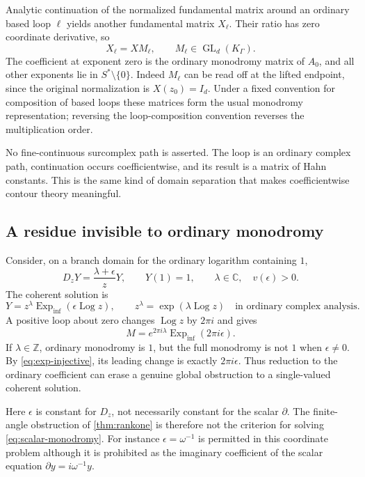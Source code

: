 \documentclass[11pt,letterpaper]{article}
\numberwithin{equation}{section}
\theoremstyle{definition}
\theoremstyle{remark}
\newcommand{\C}{\mathbb C}
\newcommand{\Z}{\mathbb Z}
\newcommand{\D}{\partial}
\newcommand{\Einf}{\operatorname{Exp}_{\mathrm{inf}}}
\newcommand{\Log}{\operatorname{Log}}
\newcommand{\GL}{\operatorname{GL}}
\begin{document}
Analytic continuation of the normalized fundamental matrix around an
ordinary based loop $\ell$ yields another fundamental matrix $X_\ell$.
Their ratio has zero coordinate derivative, so
\begin{equation}\label{eq:monodromy}
 X_\ell=X M_\ell,\qquad M_\ell\in\GL_d(K_\Gamma).
\end{equation}
The coefficient at exponent zero is the ordinary monodromy matrix of
$A_0$, and all other exponents lie in $S^*\setminus\{0\}$.
Indeed $M_\ell$ can be read off at the lifted endpoint, since the original
normalization is $X(z_0)=I_d$. Under a fixed convention for composition of
based loops these matrices form the usual monodromy representation; reversing
the loop-composition convention reverses the multiplication order.

No fine-continuous surcomplex path is asserted. The loop is an ordinary
complex path, continuation occurs coefficientwise, and its result is a
matrix of Hahn constants. This is the same kind of domain separation that
makes coefficientwise contour theory meaningful.

\subsection{A residue invisible to ordinary monodromy}
Consider, on a branch domain for the ordinary logarithm containing $1$,
\begin{equation}\label{eq:scalar-monodromy}
 D_zY=\frac{\lambda+\epsilon}{z}Y,\qquad Y(1)=1,
 \qquad \lambda\in\C,\quad v(\epsilon)>0.
\end{equation}
The coherent solution is
\[
 Y=z^\lambda\Einf(\epsilon\Log z),
 \qquad z^\lambda=\exp(\lambda\Log z)
 \quad\text{in ordinary complex analysis}.
\]
A positive loop about zero changes $\Log z$ by $2\pi i$ and gives
\begin{equation}\label{eq:infmonodromy}
 M=e^{2\pi i\lambda}\Einf(2\pi i\epsilon).
\end{equation}
If $\lambda\in\Z$, ordinary monodromy is $1$, but the full monodromy is
not $1$ when $\epsilon\ne0$. By \eqref{eq:exp-injective}, its leading
change is exactly $2\pi i\epsilon$.
Thus reduction to the ordinary coefficient can erase a genuine global
obstruction to a single-valued coherent solution.

Here $\epsilon$ is constant for $D_z$, not necessarily constant for the
scalar $\D$. The finite-angle obstruction of \cref{thm:rankone} is
therefore not the criterion for solving \eqref{eq:scalar-monodromy}.
For instance $\epsilon=\omega^{-1}$ is permitted in this coordinate
problem although it is prohibited as the imaginary coefficient of the
scalar equation $\D y=i\omega^{-1}y$.
\end{document}
